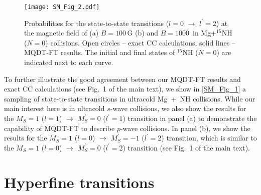 \documentclass[reprint,amssymb,noeprint,twocolumn,longbibliography]{revtex4-2}
\begin{document}
\begin{figure}[b!]
\begin{center}
\texttt{[image: SM\_Fig\_2.pdf]}
\end{center}
\caption{
Probabilities for the state-to-state transitions ($l=0$ $\to$ $l^\prime=2$) at the magnetic field of (a) $B=100$\,G (b) and $B=1000$\ 
in Mg+$^{15}$NH ($N=0$) collisions.
Open circles --  exact CC calculations, solid lines -- MQDT-FT results. The initial and final states of $^{15}$NH ($N=0$) are indicated next to each curve.
}
\label{SM_Fig_2}
\end{figure}


To further illustrate the good agreement between our MQDT-FT results and exact CC calculations (see Fig.~1 of the main text), we show in \cref{SM_Fig_1} a sampling of state-to-state transitions in ultracold Mg~+~NH collisions. 
While our main interest here is in ultracold $s$-wave collisions, we also show the results for the $M_S=1$ ($l=1$) $\to$ $M^\prime_S=0$ ($l^\prime=1$) transition in panel (a) to demonstrate the capability of MQDT-FT to describe $p$-wave collisions. In panel (b), we show the results for the $M_S=1$ ($l=0$) $\to$ $M^\prime_S=-1$ ($l^\prime=2$) transition, which is similar to the  $M_S=1$ ($l=0$) $\to$ $M^\prime_S=0$ ($l^\prime=2$) transition (see Fig.~1 of the main text).  








\section{\label{sec:SM_hf} Hyperfine transitions}
\end{document}
